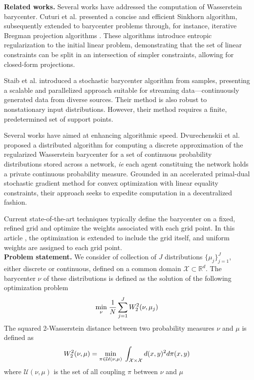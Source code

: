 \textbf{Related works.}  Several works have addressed the computation of Wasserstein barycenter. Cuturi et al. \cite{cuturi_sinkhorn_2013} presented a concise and efficient Sinkhorn algorithm, subsequently extended to barycenter problems through, for instance, iterative Bregman projection algorithms \cite{benamou_iterative_2014}. These algorithms introduce entropic regularization to the initial linear problem, demonstrating that the set of linear constraints can be split in an intersection of simpler constraints, allowing for closed-form projections.

Staib et al. \cite{staib_parallel_2017} introduced a stochastic barycenter algorithm from samples, presenting a scalable and parallelized approach suitable for streaming data—continuously generated data from diverse sources. Their method is also robust to nonstationary input distributions. However, their method requires a finite, predetermined set of support points. 

Several works have aimed at enhancing algorithmic speed. Dvurechenskii et al. \cite{dvurechenskii_decentralize_2018} proposed a distributed algorithm for computing a discrete approximation of the regularized Wasserstein barycenter for a set of continuous probability distributions stored across a network, \textit{ie} each agent constituing the network holds a private continuous probability measure. Grounded in an accelerated primal-dual stochastic gradient method for convex optimization with linear equality constraints, their approach seeks to expedite computation in a decentralized fashion.

Current state-of-the-art techniques typically define the barycenter on a fixed, refined grid and optimize the weights associated with each grid point. In this article \cite{claici_stochastic_2018}, the optimization is extended to include the grid itself, and uniform weights are assigned to each grid point. \\ 

\textbf{Problem statement.} We consider of collection of $J$ distributions $\lbrace \mu_j \rbrace_{j=1}^J$, either discrete or continuous, defined on a common domain $\mathcal{X} \subset \mathbb{R}^d$. The barycenter $\nu$ of these distributions is defined as the solution of the following optimization problem 
$$ \underset{\nu}{\min}\;\frac{1}{N}\sum_{j=1}^{J} W_2^2(\nu, \mu_j) $$
The squared 2-Wasserstein distance between two probability measures $\nu$ and $\mu$ is defined as
\begin{equation}\label{eq:W2}
     W_2^2(\nu, \mu) = \underset{\pi \in \mathcal{U}(\nu, \mu)}{\min}\; \int_{\mathcal{X}\times\mathcal{X}} d(x, y)^2 d\pi(x, y)
\end{equation}
where $\mathcal{U}(\nu, \mu)$ is the set of all coupling $\pi$ between $\nu$ and $\mu$


